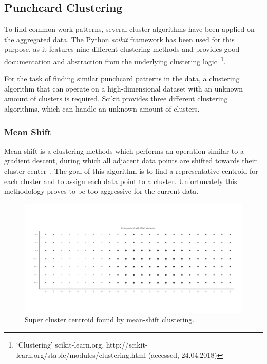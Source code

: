 \subsection{Punchcard Clustering}

To find common work patterns, several cluster algorithms have been applied on the aggregated data.
The Python \emph{scikit} framework has been used for this purpose, as it features nine different clustering methods and provides good documentation and abstraction from the underlying clustering logic~\footnote{`Clustering' scikit-learn.org, http://scikit-learn.org/stable/modules/clustering.html (accessed, 24.04.2018)}.

For the task of finding similar punchcard patterns in the data, a clustering algorithm that can operate on a high-dimensional dataset with an unknown amount of clusters is required.
Scikit provides three different clustering algorithms, which can handle an unknown amount of clusters.

\subsubsection{Mean Shift}\label{mean-shift}
Mean shift is a clustering methods which performs an operation similar to a gradient descent, during which all adjacent data points are shifted towards their cluster center~\cite{article:mean-shift}.
The goal of this algorithm is to find a representative centroid for each cluster and to assign each data point to a cluster.
Unfortunately this methodology proves to be too aggressive for the current data.

\begin{figure}[H]
    \includegraphics[scale=0.32]{./graphs/analysis-mean-shift/supercluster}
    \centering
    \caption{Super cluster centroid found by mean-shift clustering.}\label{fig:mean-shift-super-cluster}
\end{figure}

